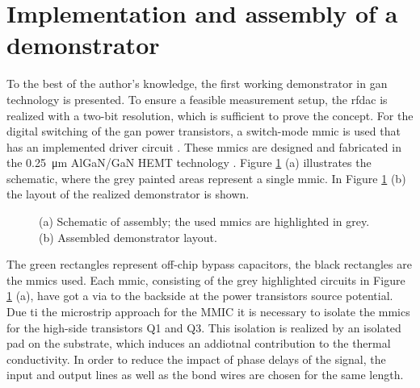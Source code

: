 \documentclass[journal]{IEEEtran}
\begin{document}
\section{Implementation and assembly of a demonstrator}
\label{sec:assembly}
To the best of the author's knowledge, the first working demonstrator in \gls{gan} technology is presented.
To ensure a feasible measurement setup, the \gls{rfdac} is realized with a two-bit resolution, which is sufficient to prove the concept.
For the digital switching of the \gls{gan} power transistors, a switch-mode \gls{mmic} is used that has an implemented driver circuit \cite{MaroldtBruecknerQuayEtAl2014}.
These \glspl{mmic} are designed and fabricated in the \SI{0.25}{\micro\meter} AlGaN/GaN HEMT technology \cite{MaroldtDriverConcept}.
Figure \ref{fig:assembled_demonstrator} (a) illustrates the schematic, where the grey painted areas represent a single \gls{mmic}.
In Figure \ref{fig:assembled_demonstrator} (b) the layout of the realized demonstrator is shown.
%
\begin{figure}[htb]
  \centering
	\begin{scriptsize}
  	\def\svgwidth{\columnwidth}
 	 
  	\caption{(a) Schematic of assembly; the used \glspl{mmic} are highlighted in grey. (b) Assembled demonstrator layout.}
  	\label{fig:assembled_demonstrator}
	\end{scriptsize}
\end{figure}
%
The green rectangles represent off-chip bypass capacitors, the black rectangles are the \glspl{mmic} used.
Each \gls{mmic}, consisting of the grey highlighted circuits in Figure \ref{fig:assembled_demonstrator} (a), have got a via to the backside 
at the power transistors source potential.
Due ti the microstrip approach for the MMIC it is necessary to isolate the \glspl{mmic} for the high-side transistors Q1 and Q3.
This isolation is realized by an isolated pad on the substrate, which induces an addiotnal contribution to the thermal conductivity.
In order to reduce the impact of phase delays of the signal, the input and output lines as well as the bond wires are chosen for the same length.
\end{document}
